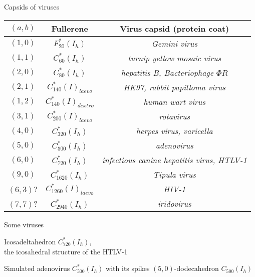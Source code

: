 \documentclass[%
pdf,
colorBG,
slideColor,
]{prosper}
\begin{document}
\begin{slide}{Capsids of viruses}
{\tiny
\begin{center}
\begin{tabular}{||c||c|c||}
\hline
\hline
$(a,b)$ & Fullerene & Virus capsid (protein coat)\\
\hline
$(1,0)$ & $F_{20}^*(I_h)$ & {\it Gemini virus} \\
$(1,1)$ & $C_{60}^*(I_h)$ & {\it turnip yellow mosaic virus} \\
$(2,0)$ & $C_{80}^*(I_h)$ & {\it hepatitis B, Bacteriophage $\Phi R$}\\
$(2,1)$ & $C_{140}^*(I)_{laevo}$ & {\it HK97, rabbit papilloma virus} \\
$(1,2)$ & $C_{140}^*(I)_{dextro}$ & {\it human wart virus} \\
$(3,1)$ & $C_{200}^*(I)_{laevo}$ & {\it rotavirus} \\
$(4,0)$ & $C_{320}^*(I_h)$ & {\it herpes virus, varicella} \\
$(5,0)$ & $C_{500}^*(I_h)$ & {\it adenovirus} \\
$(6,0)$ & $C_{720}^*(I_h)$ & {\it infectious canine hepatitis virus, HTLV-1}\\
$(9,0)$ & $C_{1620}^*(I_h)$ & {\it Tipula virus} \\
$(6,3)$? & $C_{1260}^*(I)_{laevo}$ & {\it HIV-1}\\
$(7,7)$? & $C_{2940}^*(I_h)$ & {\it iridovirus}\\ 
\hline
\hline
\end{tabular}
\end{center}
}
\end{slide}


\begin{slide}{Some viruses}
\begin{center}
\begin{minipage}[b]{5.5cm}
\centering
{}\par
Icosadeltahedron $C_{720}^*(I_h)$,\\
the icosahedral structure of the HTLV-1
\end{minipage}
\hspace{0.1cm}
\begin{minipage}[b]{5.5cm}
\centering
{}\par
Simulated adenovirus $C_{500}^*(I_h)$ with its spikes
$(5,0)$-dodecahedron $C_{500}(I_h)$
\end{minipage}
\end{center}

\end{slide}
\end{document}
